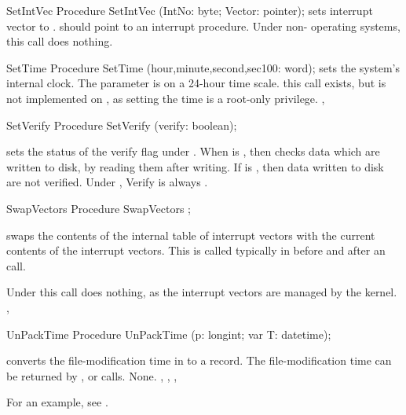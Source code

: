 \begin{procedure}{SetIntVec}
\Declaration
Procedure SetIntVec (IntNo: byte; Vector: pointer);
\Description
{} sets interrupt vector  to .
 should point to an interrupt procedure.
\Errors
Under non- \dos operating systems, this call does nothing.
\SeeAlso
{}
\end{procedure}

\begin{procedure}{SetTime}
\Declaration
Procedure SetTime (hour,minute,second,sec100: word);
\Description
{} sets the system's internal clock. The  parameter is
on a 24-hour time scale.
\Errors
this call exists, but is not implemented on \linux, 
as setting the time is a root-only privilege.
\SeeAlso
{}, 
\end{procedure}
\begin{procedure}{SetVerify}
\Declaration
Procedure SetVerify (verify: boolean);
\Description

 sets the status of the verify flag under \dos. When
 is , then \dos checks data which are written to disk,
by reading them after writing. If  is , then data
written to disk are not verified.
\Errors
Under \linux,  Verify is always
.
\SeeAlso
{}
\end{procedure}
\begin{procedure}{SwapVectors}
\Declaration
Procedure SwapVectors ;
\Description

 swaps the contents of the internal table of interrupt 
vectors with the current contents of the interrupt vectors.
This is called typically in before and after an  call.

\Errors
Under \linux this call does nothing, as the interrupt vectors are 
managed by the kernel.
\SeeAlso
{}, 
\end{procedure}
\begin{procedure}{UnPackTime}
\Declaration
Procedure UnPackTime (p: longint; var T: datetime);
\Description

 converts the file-modification time in 
to a  record. The file-modification time can be 
returned by ,  or  calls.
\Errors
None.
\SeeAlso
{}, , , 
\end{procedure}
For an example, see .

